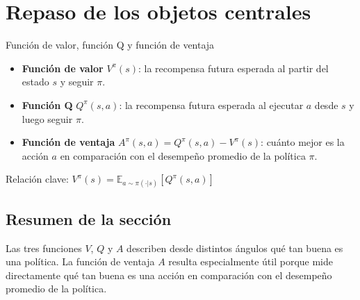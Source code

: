 \section{Repaso de los objetos centrales}

\begin{importantbox}{Función de valor, función Q y función de ventaja}
\begin{itemize}
    \item \textbf{Función de valor} $V^\pi(s)$: la recompensa futura esperada al partir del estado $s$ y seguir $\pi$.
    \item \textbf{Función Q} $Q^\pi(s, a)$: la recompensa futura esperada al ejecutar $a$ desde $s$ y luego seguir $\pi$.
    \item \textbf{Función de ventaja} $A^\pi(s, a) = Q^\pi(s, a) - V^\pi(s)$: cuánto mejor es la acción $a$ en comparación con el desempeño promedio de la política $\pi$.
\end{itemize}
Relación clave: $V^\pi(s) = \mathbb{E}_{a \sim \pi(\cdot|s)}\left[Q^\pi(s, a)\right]$
\end{importantbox}

\subsection{Resumen de la sección}

Las tres funciones $V$, $Q$ y $A$ describen desde distintos ángulos qué tan buena es una política. La función de ventaja $A$ resulta especialmente útil porque mide directamente qué tan buena es una acción en comparación con el desempeño promedio de la política.
